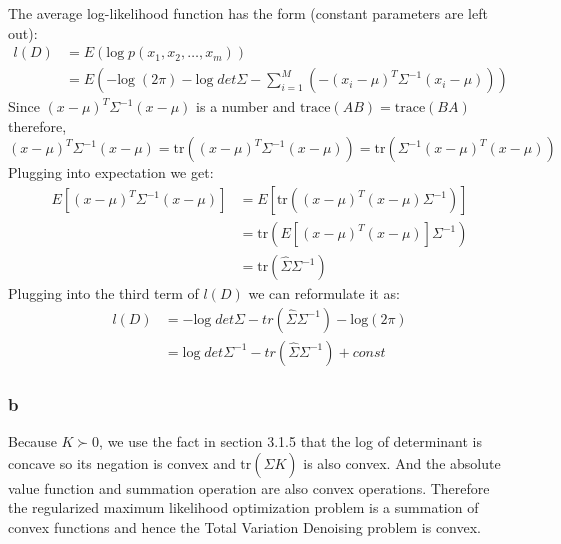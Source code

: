 \documentclass[10pt,a4paper]{article}
\begin{document}
The average log-likelihood function has the form (constant parameters are left out):
\begin{align*}
  l(D) & = E(\text{log}\;p(x_1,x_2,\dots,x_m))\\
       & = E(-\text{log}\;(2\pi) - \text{log}\;det\Sigma
  - \sum_{i=1}^{M}(-(x_i-\mu)^T\Sigma^{-1}(x_i-\mu)))
\end{align*}
Since $(x-\mu)^T\Sigma^{-1}(x-\mu)$ is a number and
$\mathrm{trace}(AB)=\mathrm{trace}(BA)$ therefore,
$$(x-\mu)^T\Sigma^{-1}(x-\mu)= \mathrm{tr}((x-\mu)^T\Sigma^{-1}(x-\mu))=\mathrm{tr}(\Sigma^{-1}(x-\mu)^T(x-\mu))$$ 
Plugging into expectation we get:
\begin{align*}
E[(x-\mu)^T\Sigma^{-1}(x-\mu)] &= E[\mathrm{tr}((x-\mu)^T(x-\mu)\Sigma^{-1})] \\
&= \mathrm{tr}(E[(x-\mu)^T(x-\mu)]\Sigma^{-1})\\
&= \mathrm{tr}(\hat{\Sigma}\Sigma^{-1})
\end{align*}
Plugging into the third term of $l(D)$ we can reformulate it as:
\begin{align*}
     l(D) &=- \text{log}\;det\Sigma - tr(\hat{\Sigma}\Sigma^{-1} )-\text{log}(2\pi)\\
       & = \text{log}\;det\Sigma^{-1} - tr(\hat{\Sigma}\Sigma^{-1} ) + const 
\end{align*}

\subsubsection{b}
Because $K\succ 0$, we use the fact in section
3.1.5\cite{boyd2004convex} that the log of determinant is
concave so its negation is convex and
$\mathrm{tr}(\hat{\Sigma}K)$ is also convex. And the
absolute value function and summation operation are also
convex operations. Therefore the regularized maximum
likelihood optimization problem is a summation of convex
functions and hence the Total Variation Denoising problem is
convex.
\end{document}
